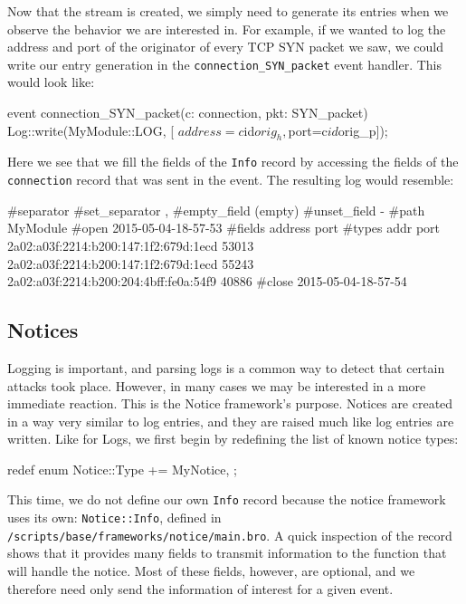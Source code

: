 
Now that the stream is created, we simply need to generate its entries when we observe the behavior we are interested in. For example, if we wanted to log the address and port of the originator of every TCP SYN packet we saw, we could write our entry generation in the \texttt{connection\_SYN\_packet} event handler. This would look like: \\

\begin{code}
event connection_SYN_packet(c: connection, pkt: SYN_packet) {
		Log::write(MyModule::LOG, [	$address=c$id$orig_h,
									$port=c$id$orig_p]);
}
\end{code}

Here we see that we fill the fields of the \texttt{Info} record by accessing the fields of the \texttt{connection} record that was sent in the event. The resulting log would resemble:

\begin{code}
#separator 
#set_separator	,
#empty_field	(empty)
#unset_field	-
#path	MyModule
#open	2015-05-04-18-57-53
#fields	address	port	
#types	addr	port
2a02:a03f:2214:b200:147:1f2:679d:1ecd	53013
2a02:a03f:2214:b200:147:1f2:679d:1ecd	55243
2a02:a03f:2214:b200:204:4bff:fe0a:54f9	40886
#close	2015-05-04-18-57-54
\end{code}


\subsection{Notices} \label{section: notice}
Logging is important, and parsing logs is a common way to detect that certain attacks took place. However, in many cases we may be interested in a more immediate reaction. This is the Notice framework's purpose. Notices are created in a way very similar to log entries, and they are raised much like log entries are written. Like for Logs, we first begin by redefining the list of known notice types: \\

\begin{code}
	redef enum Notice::Type += { MyNotice, };
\end{code}

This time, we do not define our own \texttt{Info} record because the notice framework uses its own: \texttt{Notice::Info}, defined in \texttt{/scripts/base/frameworks/notice/main.bro}. A quick inspection of the record shows that it provides many fields to transmit information to the function that will handle the notice. Most of these fields, however, are optional, and we therefore need only send the information of interest for a given event.\\

